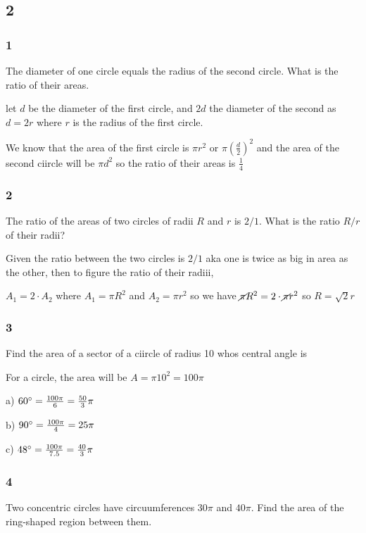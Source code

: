\documentclass[]{report}
\begin{document}
\subsection{2}

\subsubsection{1}

The diameter of one circle equals the radius of the second circle. What is the ratio of their areas.

let $d$ be the diameter of the first circle, and $2d$ the diameter of the second as $d = 2r$ where $r$ is the radius of the first circle.

We know that the area of the first circle is $\pi r^2$ or $\pi (\frac{d}{2})^2$ and the area of the second ciircle will be $\pi d^2$ so the ratio of their areas is $\frac{1}{4}$

\subsubsection{2}

The ratio of the areas of two circles of radii $R$ and $r$ is $2/1$. What is the ratio $R/r$ of their radii?

Given the ratio between the two circles is $2/1$ aka one is twice as big in area as the other, then to figure the ratio of their radiii,

$A_1 = 2\cdot A_2$ where $A_1 = \pi R^2$ and $A_2 = \pi r^2$ so we have $\cancel{\pi} R^2 = 2\cdot \cancel{\pi} r^2$ so $R = \sqrt{2} r$

\subsubsection{3}

Find the area of a sector of a ciircle of radius 10 whos central angle is 

For a circle, the area will be $A = \pi 10^2 = 100\pi$

a) $60\degree = \frac{100\pi}{6} = \frac{50}{3} \pi$ 

b) $90\degree = \frac{100\pi}{4} = 25\pi$

c) $48\degree = \frac{100\pi}{7.5} = \frac{40}{3} \pi$

\subsubsection{4}
Two concentric circles have circuumferences $30\pi$ and $40\pi$. Find the area of the ring-shaped region between them.
\end{document}
